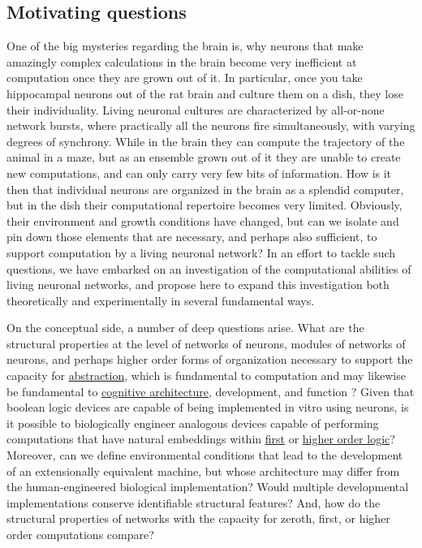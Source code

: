 \subsection{Motivating questions}
\label{sec:questions}
One of the big mysteries regarding the brain is, why neurons that make amazingly complex calculations in the brain become very inefficient at computation once they are grown out of it. In particular, once you take hippocampal neurons out of the rat brain and culture them on a dish, they lose their individuality. Living neuronal cultures are characterized by all-or-none network bursts, where practically all the neurons fire simultaneously, with varying degrees of synchrony. While in the brain they can compute the trajectory of the animal in a maze, but as an ensemble grown out of it they are unable to create new computations, and can only carry very few bits of information. How is it then that individual neurons are organized in the brain as a splendid computer, but in the dish their computational repertoire becomes very limited. Obviously, their environment and growth conditions have changed, but can we isolate and pin down those elements that are necessary, and perhaps also sufficient, to support computation by a living neuronal network? In an effort to tackle such questions, we have embarked on an investigation of the computational abilities of living neuronal networks, and propose here to expand this investigation both theoretically and experimentally in several fundamental ways.

On the conceptual side, a number of deep questions arise. What are the structural properties at the level of networks of neurons,
modules of networks of neurons, and perhaps higher order forms of
organization necessary to support the capacity for
\href{http://en.wikipedia.org/wiki/Metalinguistic\_abstraction}{abstraction},
which is fundamental to computation and may likewise be fundamental to
\href{http://en.wikipedia.org/wiki/Cognitive\_architecture}{cognitive
architecture}, development, and function \cite{Tenenbaum2011}? Given that boolean
logic devices are capable of being implemented in vitro using
neurons\cite{Feinerman2008}, is it possible to biologically engineer analogous
devices capable of performing computations that have natural embeddings
within \href{http://en.wikipedia.org/wiki/First-order\_logic}{first} or
\href{http://en.wikipedia.org/wiki/Higher\_order\_logic}{higher order
logic}? Moreover, can we define environmental conditions that lead to
the development of an extensionally equivalent machine, but whose
architecture may differ from the human-engineered biological
implementation? Would multiple developmental implementations conserve
identifiable structural features? And, how do the structural properties
of networks with the capacity for zeroth, first, or higher order
computations compare?

